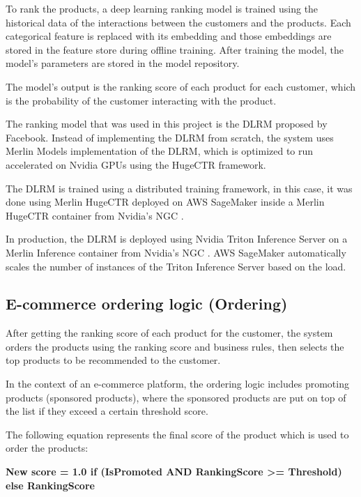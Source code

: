 To rank the products, a deep learning ranking model is trained using the historical data of the interactions between the customers and the products.
Each categorical feature is replaced with its embedding and those embeddings are stored in the feature store during offline training. 
After training the model, the model's parameters are stored in the model repository.

The model's output is the ranking score of each product for each customer, which is the probability of the customer interacting with the product.

The ranking model that was used in this project is the DLRM \cite{facebook_dlrm} proposed by Facebook.
Instead of implementing the DLRM from scratch, 
the system uses Merlin Models \cite{MerlinModels}
 implementation of the DLRM, 
 which is optimized to run accelerated on Nvidia GPUs using the HugeCTR \cite{NvidiaHugeCTR} framework.

The DLRM is trained using a distributed training framework, in this case, it was done using Merlin HugeCTR \cite{NvidiaHugeCTR} deployed on AWS SageMaker \cite{AwsSageMaker} inside a Merlin HugeCTR container \cite{HugeCTRContainer} from Nvidia's NGC \cite{NvidiaNGC}.

In production, the DLRM is deployed using Nvidia Triton Inference Server \cite{Triton} on a Merlin Inference container \cite{NvidiaMerlinInference} from Nvidia's NGC \cite{NvidiaNGC}.
AWS SageMaker \cite{AwsSageMaker} automatically scales the number of instances of the Triton Inference Server based on the load.

\subsection{E-commerce ordering logic (Ordering)}

After getting the ranking score of each product for the customer, the system orders the products using the ranking score and business rules, 
then selects the top products to be recommended to the customer.


In the context of an e-commerce platform, the ordering logic includes promoting products (sponsored products), 
where the sponsored products are put on top of the list if they exceed a certain threshold score.

The following equation represents the final score of the product which is used to order the products:

\textbf{New score = { 1.0  if (IsPromoted AND RankingScore >= Threshold) else RankingScore }}

